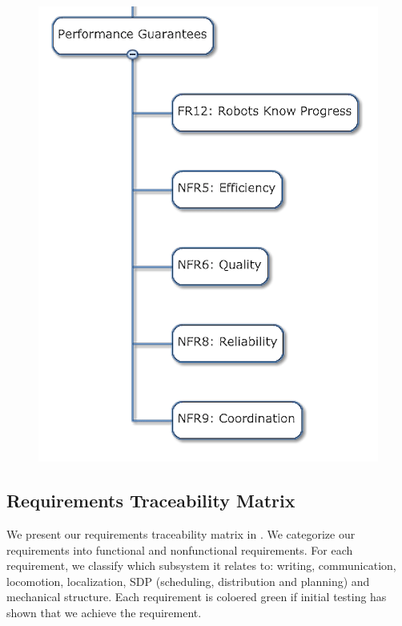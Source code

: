\begin{figure}[h!]
\centering
\includegraphics[width=0.98\columnwidth]{figs/objectives_tree/objectives_tree_performance.png}
\label{fig:obj_tree_performance}
\end{figure}

\clearpage

\subsection{Requirements Traceability Matrix}
\label{sec:requirements_matrix}

We present our requirements traceability matrix in . We categorize our requirements into functional and nonfunctional requirements. For each requirement, we classify which subsystem it relates to: writing, communication, locomotion, localization, SDP (scheduling, distribution and planning) and mechanical structure. Each requirement is coloered green if initial testing has shown that we achieve the requirement. 

